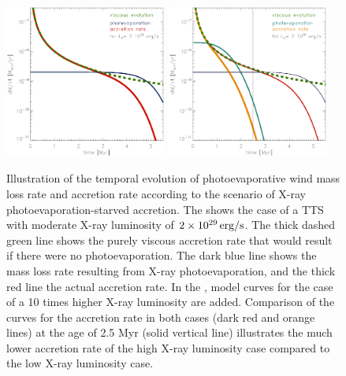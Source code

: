 \documentclass[10pt,fleqn,twoside]{article}
\begin{document}
\begin{figure} %
\centering
\includegraphics[width=0.475\textwidth]{model1.ps}\hspace{5mm}
\includegraphics[width=0.475\textwidth]{model2.ps}
\caption{Illustration of the temporal evolution of photoevaporative wind
mass loss rate and accretion rate according to the scenario of
X-ray photoevaporation-starved accretion.
The  shows the case of a TTS with moderate X-ray luminosity
of $2 \times 10^{29}\,\rm erg/s$. The thick dashed green line shows the
purely viscous accretion rate that would result if there were
no photoevaporation. The dark blue line shows the mass loss rate resulting
from X-ray photoevaporation, and the thick red line the actual accretion rate.
\newline
In the , model curves for the case of a 10 times
higher X-ray luminosity are added.
Comparison of the curves for the accretion rate in both cases
(dark red and orange lines) at the age of 2.5 Myr (solid vertical line)
illustrates the much lower accretion rate
of the high X-ray luminosity case compared to the low  X-ray luminosity case.
\label{PSA_prediction.fig}}
\end{figure} %
\end{document}
